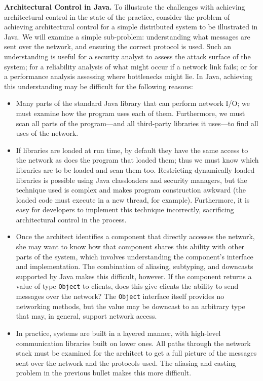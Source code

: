 \documentclass[runningheads]{llncs}
\newcommand{\minisec}[1]{\vspace{2ex}\noindent\textbf{#1}}
\begin{document}
\begin{sloppypar}
\minisec{Architectural Control in Java.}  To illustrate the challenges with achieving architectural control in the state of the practice, consider the problem of achieving architectural control for a simple distributed system to be illustrated in Java.  We will examine a simple sub-problem: understanding what messages are sent over the network, and ensuring the correct protocol is used.  Such an understanding is useful for a security analyst to assess the attack surface of the system; for a reliability analysis of what might occur if a network link fails; or for a performance analysis assessing where bottlenecks might lie.  In Java, achieving this understanding may be difficult for the following reasons:

\begin{itemize}

\item Many parts of the standard Java library that can perform network I/O; we must examine how the program uses each of them. Furthermore, we must scan all parts of the program---and all third-party libraries it uses---to find all uses of the network.

\item If libraries are loaded at run time, by default they have the same access to the network as does the program that loaded them; thus we must know which libraries are to be loaded and scan them too.  Restricting dynamically loaded libraries is possible using Java classloaders and security managers, but the technique used is complex and makes program construction awkward (the loaded code must execute in a new thread, for example).  Furthermore, it is easy for developers to implement this technique incorrectly, sacrificing architectural control in the process.

\item Once the architect identifies a component that directly accesses the network, she may want to know how that component shares this ability with other parts of the system, which involves understanding the component's interface and implementation.  The combination of aliasing, subtyping, and downcasts supported by Java makes this difficult, however.  If the component returns a value of type \texttt{Object} to clients, does this give clients the ability to send messages over the network?  The \texttt{Object} interface itself provides no networking methods, but the value may be downcast to an arbitrary type that may, in general, support network access.

\item In practice, systems are built in a layered manner, with high-level communication libraries built on lower ones.  All paths through the network stack must be examined for the architect to get a full picture of the messages sent over the network and the protocols used.  The aliasing and casting problem in the previous bullet makes this more difficult.


\end{itemize}
\end{sloppypar}
\end{document}
